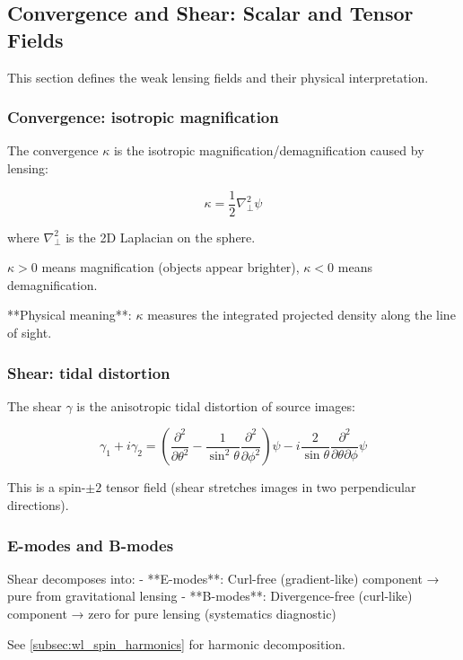 \subsection{Convergence and Shear: Scalar and Tensor Fields}\label{subsec:wl_convergence_shear}

This section defines the weak lensing fields and their physical interpretation.

\subsubsection{Convergence: isotropic magnification}

The convergence $\kappa$ is the isotropic magnification/demagnification caused by lensing:

\begin{equation}
\kappa = \frac{1}{2}\nabla^2_\perp \psi
\end{equation}

where $\nabla^2_\perp$ is the 2D Laplacian on the sphere.

$\kappa > 0$ means magnification (objects appear brighter), $\kappa < 0$ means demagnification.

**Physical meaning**: $\kappa$ measures the integrated projected density along the line of sight.

\subsubsection{Shear: tidal distortion}

The shear $\gamma$ is the anisotropic tidal distortion of source images:

\begin{equation}
\gamma_1 + i\gamma_2 = \left(\frac{\partial^2}{\partial\theta^2} - \frac{1}{\sin^2\theta}\frac{\partial^2}{\partial\phi^2}\right) \psi - i \frac{2}{\sin\theta} \frac{\partial^2}{\partial\theta \partial\phi} \psi
\end{equation}

This is a spin-$\pm 2$ tensor field (shear stretches images in two perpendicular directions).

\subsubsection{E-modes and B-modes}

Shear decomposes into:
- **E-modes**: Curl-free (gradient-like) component → pure from gravitational lensing
- **B-modes**: Divergence-free (curl-like) component → zero for pure lensing (systematics diagnostic)

See \cref{subsec:wl_spin_harmonics} for harmonic decomposition.
